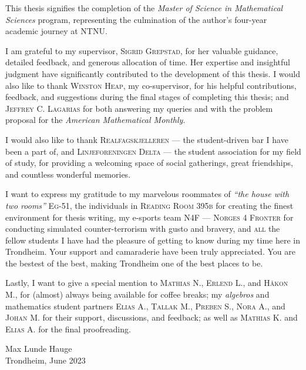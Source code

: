 


\vspace{.25in}

This thesis signifies the completion of the \textit{Master of Science in Mathematical Sciences} program, representing the culmination of the author's four-year academic journey at NTNU.

I am grateful to my supervisor, \textsc{Sigrid Grepstad}, for her valuable guidance, detailed feedback, and generous allocation of time. Her expertise and insightful judgment have significantly contributed to the development of this thesis. I would also like to thank \textsc{Winston Heap}, my co-supervisor, for his helpful contributions, feedback, and suggestions during the final stages of completing this thesis; and \textsc{Jeffrey C. Lagarias} for both answering my queries and with the problem proposal for the \emph{American Mathematical Monthly}.   

I would also like to thank \textsc{Realfagskjelleren} — the student-driven bar I have been a part of, and \textsc{Linjeforeningen Delta} — the student association for my field of study, for providing a welcoming space of social gatherings, great friendships, and countless wonderful memories. 

I want to express my gratitude to my marvelous roommates of \emph{\enquote{the house with two rooms}} \textsc{Eg-51}, the individuals in \textsc{Reading Room 395b} for creating the finest environment for thesis writing, my e-sports team \textsc{N4F — Norges 4 Fronter} for conducting simulated counter-terrorism with gusto and bravery, and \textsc{all} the fellow students I have had the pleasure of getting to know during my time here in Trondheim. Your support and camaraderie have been truly appreciated. You are the bestest of the best, making Trondheim one of the best places to be. 

Lastly, I want to give a special mention to \textsc{Mathias N.}, \textsc{Erlend L.}, and \textsc{Håkon M.}, for (almost) always being available for coffee breaks; my \emph{algebros} and mathematics student partners \textsc{Elias A.}, \textsc{Tallak M.}, \textsc{Preben S.}, \textsc{Nora A.}, and \textsc{Johan M.} for their support, discussions, and feedback; as well as \textsc{Mathias K.} and \textsc{Elias A.} for the final proofreading.


\vspace*{1cm}

\begin{flushright}
    Max Lunde Hauge\\
    Trondheim, June 2023
\end{flushright}
